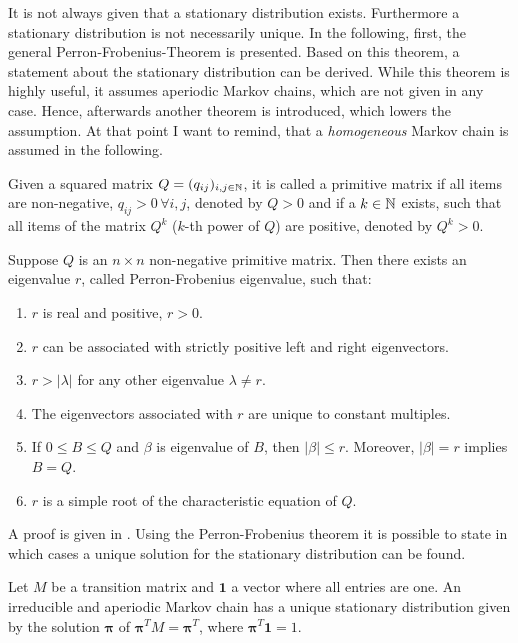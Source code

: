 It is not always given that a stationary distribution exists. Furthermore a stationary distribution is not necessarily unique. In the following, first, the general Perron-Frobenius-Theorem \parencite{seneta2006non, pillai2005perron} is presented. Based on this theorem, a statement about the stationary distribution can be derived. While this theorem is highly useful, it assumes aperiodic Markov chains, which are not given in any case. Hence, afterwards another theorem is introduced, which lowers the assumption. At that point I want to remind, that a \emph{homogeneous} Markov chain is assumed in the following.

\begin{definition}
Given a squared matrix $Q = (q_{ij})_{i,j \in\mathbb{N}}$, it is called a primitive matrix if all items are non-negative, $q_{ij} > 0 \,\forall i,j$, denoted by $Q > 0$ and if a $k \in \mathbb{N}$ exists, such that all items of the matrix $Q^k$ ($k$-th power of $Q$) are positive, denoted by $Q^k > 0$.
\end{definition}

\begin{theorem}
\label{eq:perron-frobenius}
Suppose $Q$ is an $n \times n$ non-negative primitive matrix. Then there exists an eigenvalue $r$, called Perron-Frobenius eigenvalue, such that:

\begin{enumerate}
\item $r$ is real and positive, $r>0$.
\item $r$ can be associated with strictly positive left and right eigenvectors.
\item $r > |\lambda|$ for any other eigenvalue $\lambda \neq r$.
\item The eigenvectors associated with $r$ are unique to constant multiples.
\item If $0 \le B \le Q$ and $\beta$ is eigenvalue of $B$, then $|\beta| \le r$. Moreover, $|\beta| = r$ implies $B = Q$.
\item $r$ is a simple root of the characteristic equation of $Q$.
\end{enumerate}
\end{theorem}

A proof is given in \textcite[Theorem 1.1]{seneta2006non}. Using the Perron-Frobenius theorem it is possible to state in which cases a unique solution for the stationary distribution can be found.

\begin{theorem}
\label{th:markov-stat}
Let $M$ be a transition matrix and $\bm 1$ a vector where all entries are one. An irreducible and aperiodic Markov chain has a unique stationary distribution given by the solution $\bm\pi$ of $\bm\pi^T M = \bm\pi^T$, where $\bm\pi^T \mathbf{1} = 1$.
\end{theorem}


